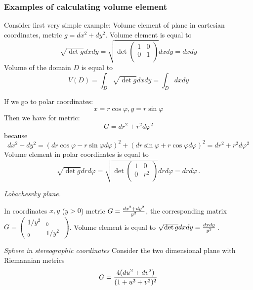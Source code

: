 \documentclass[12pt]{article}
\theoremstyle{theorem}
\numberwithin{equation}{section}
\begin{document}
\subsubsection { Examples of calculating volume element}

Consider first very simple example: Volume element of plane in cartesian coordinates,
metric $g=dx^2+dy^2$. Volume element  is equal to
                      $$
         \sqrt {\det g}dxdy=
         \sqrt
           {
         \det
         \left(
    \begin{array}{cc}
  1 & 0 \\
  0&  1 \\
\end{array}
\right)}dxdy=dxdy
                      $$
  Volume of the domain $D$ is equal to
              $$
          V(D)=\int_D\sqrt {\det g}dxdy=\int_D dxdy
              $$

If we go to polar coordinates:
 \begin{equation}\label{polarcoord1}
    x=r\cos\varphi, y=r\sin\varphi
\end{equation}
Then we have for metric:
              $$
G=dr^2+r^2d\varphi^2
              $$
because
               \begin{equation}\label{polarknow}
       dx^2+dy^2=(dr\cos\varphi-r\sin\varphi d\varphi)^2+
    (dr\sin\varphi+r\cos\varphi d\varphi)^2
       =dr^2+r^2 d\varphi^2
              \end{equation}
Volume element in polar coordinates is equal to
  $$
           \sqrt {\det g}drd\varphi=
         \sqrt
           {
         \det
         \left(
    \begin{array}{cc}
  1 & 0 \\
  0&  r^2 \\
\end{array}
\right)}drd\varphi=drd\varphi\,.
  $$

\m

{\it Lobachesvky plane.}

 In coordinates $x,y$ ($y>0$) metric $G={dx^2+dy^2\over y^2}$,
 the corresponding matrix $G=\begin{pmatrix}
      {1/y^2} & _0 \\
   _0 & {1/y^2} \
 \end{pmatrix}$. Volume element is equal to
 $\sqrt {\det g} dxdy={dxdy\over y^2}$\,.

\medskip


 {  \it Sphere in stereographic coordinates}
Consider the two dimensional plane with Riemannian metrics
                     \begin{equation}\label{stereographic}
    G={4(du^2+dv^2)\over (1+u^2+v^2)^2}
\end{equation}
\end{document}
